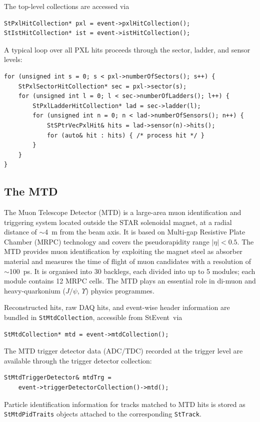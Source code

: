\documentclass[twoside]{article}
\newcommand{\StEvent}{\textsf{StEvent}}
\begin{document}
The top-level collections are accessed via
\begin{verbatim}
StPxlHitCollection* pxl = event->pxlHitCollection();
StIstHitCollection* ist = event->istHitCollection();
\end{verbatim}

A typical loop over all PXL hits proceeds through the sector, ladder, and
sensor levels:
\begin{verbatim}
for (unsigned int s = 0; s < pxl->numberOfSectors(); s++) {
    StPxlSectorHitCollection* sec = pxl->sector(s);
    for (unsigned int l = 0; l < sec->numberOfLadders(); l++) {
        StPxlLadderHitCollection* lad = sec->ladder(l);
        for (unsigned int n = 0; n < lad->numberOfSensors(); n++) {
            StSPtrVecPxlHit& hits = lad->sensor(n)->hits();
            for (auto& hit : hits) { /* process hit */ }
        }
    }
}
\end{verbatim}

\subsection{The MTD}

The Muon Telescope Detector (MTD) is a large-area muon identification and
triggering system located outside the STAR solenoidal magnet, at a radial
distance of $\sim$4~m from the beam axis.  It is based on Multi-gap Resistive
Plate Chamber (MRPC) technology and covers the pseudorapidity range
$|\eta|<0.5$.  The MTD provides muon identification by exploiting the magnet
steel as absorber material and measures the time of flight of muon candidates
with a resolution of $\sim$100~ps.  It is organised into 30 backlegs, each
divided into up to 5 modules; each module contains 12 MRPC cells.  The MTD
plays an essential role in di-muon and heavy-quarkonium ($J/\psi$,
$\Upsilon$) physics programmes.

Reconstructed hits, raw DAQ hits, and event-wise header information are
bundled in \texttt{StMtdCollection}, accessible from \StEvent\ via
\begin{verbatim}
StMtdCollection* mtd = event->mtdCollection();
\end{verbatim}
The MTD trigger detector data (ADC/TDC) recorded at the trigger level are
available through the trigger detector collection:
\begin{verbatim}
StMtdTriggerDetector& mtdTrg =
    event->triggerDetectorCollection()->mtd();
\end{verbatim}
Particle identification information for tracks matched to MTD hits is stored
as \texttt{StMtdPidTraits} objects attached to the corresponding
\texttt{StTrack}.
\end{document}
